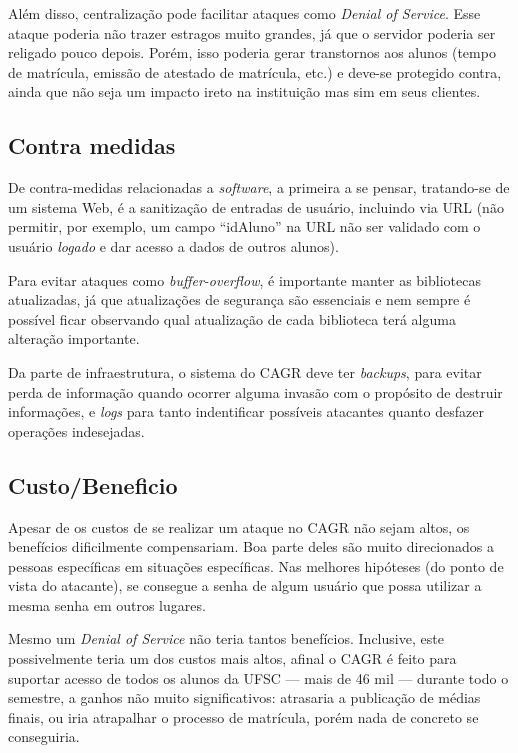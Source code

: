 \documentclass{article}
\begin{document}
    Além disso, centralização pode facilitar ataques como \textit{Denial of
    Service}. Esse ataque poderia não trazer estragos muito grandes, já que o
    servidor poderia ser religado pouco depois. Porém, isso poderia gerar
    transtornos aos alunos (tempo de matrícula, emissão de atestado de
    matrícula, etc.) e deve-se protegido contra, ainda que não seja um impacto
    ireto na instituição mas sim em seus clientes.

    \subsection{Contra medidas}

    De contra-medidas relacionadas a \textit{software}, a primeira a se pensar,
    tratando-se de um sistema Web, é a sanitização de entradas de usuário,
    incluindo via URL (não permitir, por exemplo, um campo ``idAluno'' na URL
    não ser validado com o usuário \textit{logado} e dar acesso a dados de
    outros alunos).

    Para evitar ataques como \textit{buffer-overflow}, é importante manter as
    bibliotecas atualizadas, já que atualizações de segurança são essenciais e
    nem sempre é possível ficar observando qual atualização de cada biblioteca
    terá alguma alteração importante.

    Da parte de infraestrutura, o sistema do CAGR deve ter \textit{backups},
    para evitar perda de informação quando ocorrer alguma invasão com o
    propósito de destruir informações, e \textit{logs} para tanto indentificar
    possíveis atacantes quanto desfazer operações indesejadas.

    \subsection{Custo/Beneficio}

    Apesar de os custos de se realizar um ataque no CAGR não sejam altos, os
    benefícios dificilmente compensariam. Boa parte deles são muito
    direcionados a pessoas específicas em situações específicas. Nas melhores
    hipóteses (do ponto de vista do atacante), se consegue a senha de algum
    usuário que possa utilizar a mesma senha em outros lugares.

    Mesmo um \textit{Denial of Service} não teria tantos benefícios. Inclusive,
    este possivelmente teria um dos custos mais altos, afinal o CAGR é feito
    para suportar acesso de todos os alunos da UFSC --- mais de 46 mil ---
    durante todo o semestre, a ganhos não muito significativos: atrasaria a
    publicação de médias finais, ou iria atrapalhar o processo de matrícula,
    porém nada de concreto se conseguiria.
\end{document}
